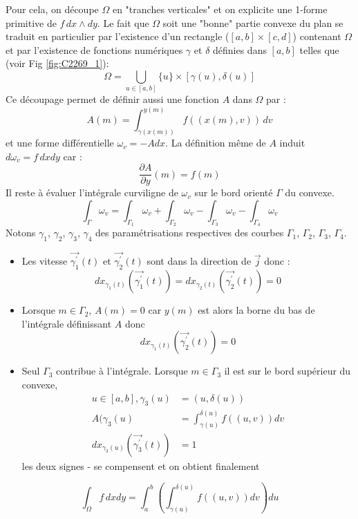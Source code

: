 Pour cela, on découpe $\Omega$ en "tranches verticales" et on explicite une 1-forme primitive de $f\,dx\wedge dy$.\newline
Le fait que $\Omega$ soit une "bonne" partie convexe du plan se traduit en particulier par l'existence d'un rectangle ($[a,b]\times[c,d]$) contenant $\Omega$ et par l'existence de fonctions numériques $\gamma$ et $\delta$ définies dans $[a,b]$ telles que (voir Fig \ref{fig:C2269_1}):
\begin{displaymath}
 \Omega = \bigcup_{u\in[a,b]}\{u\}\times [\gamma(u),\delta(u)]
\end{displaymath}
Ce découpage permet de définir aussi une fonction $A$ dans $\Omega$  par :
\begin{displaymath}
 A(m) = \int_{\gamma(x(m))}^{y(m)}f((x(m),v))\,dv
\end{displaymath}
et une forme différentielle $\omega_v = -Adx$. La définition même de $A$ induit $d\omega_v = f\, dx dy$ car :
\begin{displaymath}
 \dfrac{\partial A}{\partial y}(m)=f(m)
\end{displaymath}
Il reste à évaluer l'intégrale curviligne de $\omega_v$ sur le bord orienté $\Gamma$ du convexe.
\begin{displaymath}
 \int_\Gamma \omega_v = \int_{\Gamma_1}\omega_v + \int_{\Gamma_2}\omega_v - \int_{\Gamma_3}\omega_v - \int_{\Gamma_4}\omega_v
\end{displaymath}
Notons $\gamma_1$, $\gamma_2$, $\gamma_3$, $\gamma_4$ des paramétrisations respectives des courbes $\Gamma_1$, $\Gamma_2$, $\Gamma_3$, $\Gamma_4$.
\begin{itemize}
 \item Les vitesse $\overrightarrow{\gamma_1^\prime}(t)$ et $\overrightarrow{\gamma_2^\prime}(t)$ sont dans la direction de $\overrightarrow{j}$ donc :
\begin{displaymath}
 dx_{\gamma_1(t)}(\overrightarrow{\gamma_1^\prime}(t)) = dx_{\gamma_2(t)}(\overrightarrow{\gamma_2^\prime}(t)) = 0
\end{displaymath}
\item Lorsque $m\in \Gamma_2$, $A(m)=0$ car $y(m)$ est alors la borne du bas de l'intégrale définissant $A$ donc
\begin{displaymath}
 dx_{\gamma_1(t)}(\overrightarrow{\gamma_2^\prime}(t)) = 0
\end{displaymath}
 \item Seul $\Gamma_3$ contribue à l'intégrale. Lorsque $m\in \Gamma_3$ il est sur le bord supérieur du convexe,
\begin{align*}
 u\in[a,b] , \gamma_3(u) &= (u,\delta(u)) \\
A(\gamma_3(u)  &= \int_{\gamma(u)}^{\delta(u)} f((u,v))dv \\
dx_{\gamma_3(u)}(\overrightarrow{\gamma_3^\prime}(t)) &= 1
\end{align*}
 les deux signes - se compensent et on obtient finalement
\end{itemize}
\begin{displaymath}
 \int_\Omega f\,dxdy = \int_{a}^{b}\left(\int_{\gamma(u)}^{\delta(u)} f((u,v))dv \right) du
\end{displaymath}


